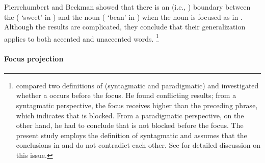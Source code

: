 Pierrehumbert and Beckman showed that
there is an  (i.e., ) boundary
between the  ( `sweet' in \Last[A]) and the noun ( `bean' in \Last[b])
when the noun is focused as in \Last.
Although the results are complicated,
they conclude that their generalization applies to both accented and unaccented words.%
 \footnote{
  compared two definitions of  (syntagmatic and paradigmatic) and investigated whether a  occurs before the focus.
 He found conflicting results;
 from a syntagmatic perspective, the focus receives higher  than the preceding phrase, which indicates that  is blocked.
 From a paradigmatic perspective, on the other hand,
 he had to conclude that  is not blocked before the focus.
 The present study employs the definition of syntagmatic 
 and assumes that the conclusions in  and  do not contradict each other.
 See  for detailed discussion on this issue.
 }



\paragraph{Focus projection}

